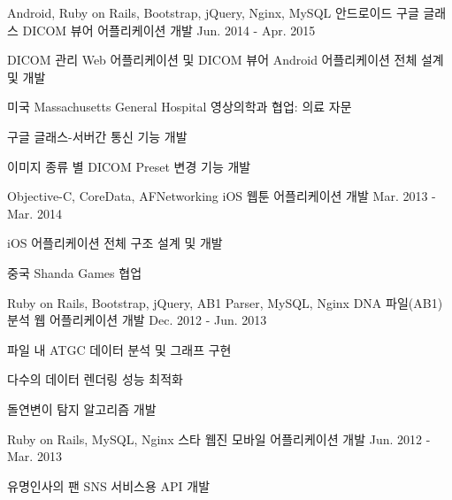 \begin{cvexpentries}
  \cvexpentry
    {Android, Ruby on Rails, Bootstrap, jQuery, Nginx, MySQL}
    {안드로이드 구글 글래스 DICOM 뷰어 어플리케이션 개발}
    {Jun. 2014 - Apr. 2015}
    {}
    {
        \begin{cvitems}
            \item {DICOM 관리 Web 어플리케이션 및 DICOM 뷰어 Android 어플리케이션 전체 설계 및 개발}
            \item {미국 Massachusetts General Hospital 영상의학과 협업: 의료 자문}
            \item {구글 글래스-서버간 통신 기능 개발}
            \item {이미지 종류 별 DICOM Preset 변경 기능 개발}
        \end{cvitems}
    }
\end{cvexpentries}

\begin{cvexpentries}
  \cvexpentry
    {Objective-C, CoreData, AFNetworking}
    {iOS 웹툰 어플리케이션 개발}
    {Mar. 2013 - Mar. 2014}
    {}
    {
        \begin{cvitems}
            \item {iOS 어플리케이션 전체 구조 설계 및 개발}            
            \item {중국 Shanda Games 협업}
        \end{cvitems}
    }
\end{cvexpentries}

\begin{cvexpentries}
  \cvexpentry
    {Ruby on Rails, Bootstrap, jQuery, AB1 Parser, MySQL, Nginx}
    {DNA 파일(AB1) 분석 웹 어플리케이션 개발}
    {Dec. 2012 - Jun. 2013}
    {}
    {
        \begin{cvitems}
            \item {파일 내 ATGC 데이터 분석 및 그래프 구현}
            \item {다수의 데이터 렌더링 성능 최적화}
            \item {돌연변이 탐지 알고리즘 개발}
        \end{cvitems}
    }
\end{cvexpentries}

\begin{cvexpentries}
  \cvexpentry
    {Ruby on Rails, MySQL, Nginx}
    {스타 웹진 모바일 어플리케이션 개발}
    {Jun. 2012 - Mar. 2013}
    {}
    {
        \begin{cvitems}
            \item {유명인사의 팬 SNS 서비스용 API 개발}
        \end{cvitems}
    }
\end{cvexpentries}

